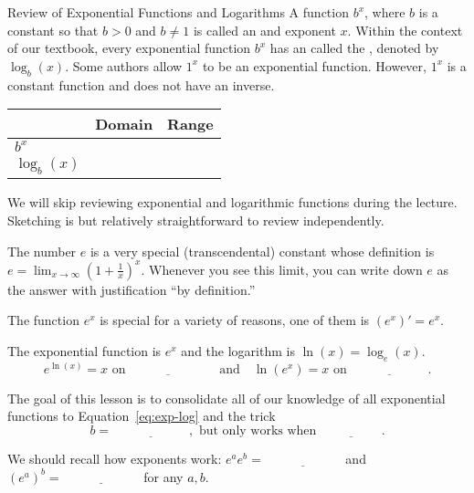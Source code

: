 \documentclass[../main.tex]{subfiles}
\begin{document}
\begin{lesson}{Review of Exponential Functions and Logarithms}
  A function \(b^{x}\), where \(b\) is a constant so that \(b > 0\) and \(b \ne 1\) is called an  and exponent \(x\). Within the context of our textbook, every exponential function \(b^{x}\) has an  called the , denoted by \(\log_{b}(x)\). \newline
  {\scriptsize Some authors allow \(1^{x}\) to be an exponential function. However, \(1^{x}\) is a constant function and does not have an inverse.}

  \begin{center}
    \begin{tabular}{l|p{1in}|p{1in}}
    & Domain & Range \\\midrule
      \(b^{x}\) & & \\\midrule
      \(\log_{b}(x)\) & &
    \end{tabular}
  \end{center}

  \faExclamationTriangle{} We will skip reviewing  exponential and logarithmic functions during the lecture. Sketching is  but relatively straightforward to review independently.


  The number \(e\) is a very special (transcendental) constant whose definition is \(e = \lim_{x \to \infty} \left( 1 + \frac{1}{x} \right)^{x}\). Whenever you see this limit, you can write down \(e\) as the answer with justification ``by definition.''
  \bigskip

  The function \(e^{x}\) is special for a variety of reasons, one of them is \((e^{x})' = e^{x}\).
  \begin{mdframed}[style=simple]
    The  exponential function is \(e^{x}\) and the  logarithm is \(\ln(x) = \log_{e}(x)\).
    \begin{equation} \label{eq:exp-log}
      e^{\ln(x)} = x \text{ on } \underline{\hspace{1in}} \quad\text{and}\quad \ln(e^{x}) = x \text{ on } \underline{\hspace{1in}}.
    \end{equation}

    The goal of this lesson is to consolidate all of our knowledge of all exponential functions to Equation~\eqref{eq:exp-log} and the  trick
    \begin{equation} \label{eq:exp-change-of-base}
      b = \underline{\hspace{1in}}, \text{ but only works when } \underline{\hspace{2cm}}.
    \end{equation}
  \end{mdframed}
  We should recall how exponents work: \(e^{a}e^{b} = \underline{\hspace{1in}}\) and \((e^{a})^{b} = \underline{\hspace{1in}}\) for any \(a,b\).


\end{lesson}
\end{document}
